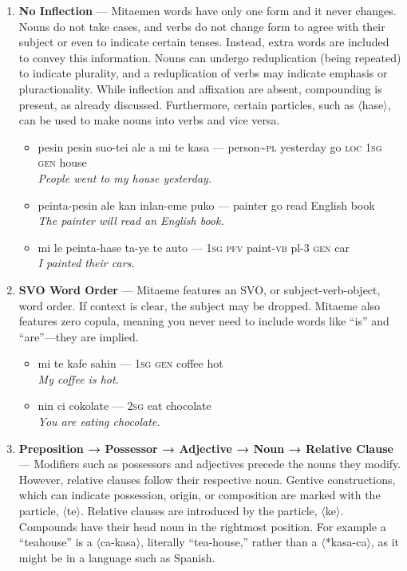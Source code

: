 \documentclass[a4paper]{article}
\begin{document}
\begin{enumerate}
	\item \textbf{No Inflection} — Mitaemen words have only one form and it never changes. Nouns do not take cases, and verbs do not change form to agree with their subject or even to indicate certain tenses. Instead, extra words are included to convey this information. Nouns can undergo reduplication (being repeated) to indicate plurality, and a reduplication of verbs may indicate emphasis or pluractionality. While inflection and affixation are absent, compounding is present, as already discussed.  Furthermore, certain particles, such as $\langle$hase$\rangle$, can be used to make nouns into verbs and vice versa.
	\begin{itemize}
		\item pesin pesin suo-tei ale a mi te kasa — person\textasciitilde{}\textsc{pl} yesterday go \textsc{loc 1sg gen} house\\\textit{People went to my house yesterday.}
		\item peinta-pesin ale kan inlan-eme puko — painter go read English book\\\textit{The painter will read an English book.}
		\item mi le peinta-hase ta-ye te auto — \textsc{1sg pfv} paint-\textsc{vb} pl-3 \textsc{gen} car \\\textit{I painted their cars.}
	\end{itemize}
	\item \textbf{SVO Word Order} — Mitaeme features an SVO, or subject-verb-object, word order. If context is clear, the subject may be dropped. Mitaeme also features zero copula, meaning you never need to include words like ``is'' and ``are''—they are implied.
	\begin{itemize}
		\item mi te kafe sahin — \textsc{1sg} \textsc{gen} coffee hot\\\textit{My coffee is hot.}
		\item nin ci cokolate — \textsc{2sg} eat chocolate\\\textit{You are eating chocolate.}
	\end{itemize}
	\item \textbf{ Preposition → Possessor → Adjective → Noun → Relative Clause  } — Modifiers such as possessors and adjectives precede the nouns they modify. However, relative clauses follow their respective noun. Gentive constructions, which can indicate possession, origin, or composition are marked with the particle, $\langle$te$\rangle$. Relative clauses are introduced by the particle, $\langle$ke$\rangle$. Compounds have their head noun in the rightmost position. For example a ``teahouse'' is a $\langle$ca-kasa$\rangle$, literally ``tea-house,'' rather than a $\langle$*kasa-ca$\rangle$, as it might be in a language such as Spanish.

\end{enumerate}
\end{document}
